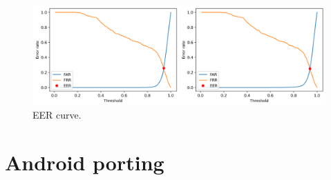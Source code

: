 \documentclass{article}
\begin{document}
\begin{figure}[H]
    \label{fig:eer}
    \begin{center}
        \includegraphics[width=16cm,keepaspectratio]{images/eer_comparison.png}
        \caption{EER curve.}
    \end{center}
\end{figure}

\blindtext

\section{Android porting}
\end{document}
